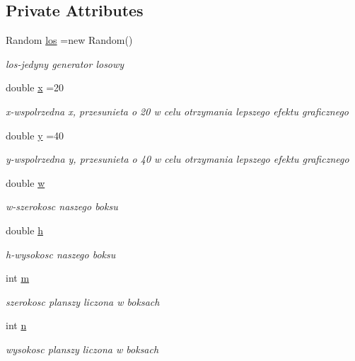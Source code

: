 \subsection*{Private Attributes}
\begin{DoxyCompactItemize}
\item 
Random \hyperlink{class_zadanie7_1_1_okno_wlasciwe_a9ae176d92e991a053b101aad6fdf7cdf}{los} =new Random()
\begin{DoxyCompactList}\small\item\em los-\/jedyny generator losowy \end{DoxyCompactList}\item 
double \hyperlink{class_zadanie7_1_1_okno_wlasciwe_afc22e58c9c97b94e580568fb79a36bef}{x} =20
\begin{DoxyCompactList}\small\item\em x-\/wspolrzedna x, przesunieta o 20 w celu otrzymania lepszego efektu graficznego \end{DoxyCompactList}\item 
double \hyperlink{class_zadanie7_1_1_okno_wlasciwe_a59d4e6fb76e7711fb07bfcb0df74d9e6}{y} =40
\begin{DoxyCompactList}\small\item\em y-\/wspolrzedna y, przesunieta o 40 w celu otrzymania lepszego efektu graficznego \end{DoxyCompactList}\item 
double \hyperlink{class_zadanie7_1_1_okno_wlasciwe_a160d088398a77a3897d8bac099c56577}{w}
\begin{DoxyCompactList}\small\item\em w-\/szerokosc naszego boksu \end{DoxyCompactList}\item 
double \hyperlink{class_zadanie7_1_1_okno_wlasciwe_ac8bed36b0724579fa1bab6098bbd4204}{h}
\begin{DoxyCompactList}\small\item\em h-\/wysokosc naszego boksu \end{DoxyCompactList}\item 
int \hyperlink{class_zadanie7_1_1_okno_wlasciwe_a2ac6a5aa6284f4835a12a68754ae80b8}{m}
\begin{DoxyCompactList}\small\item\em szerokosc planszy liczona w boksach \end{DoxyCompactList}\item 
int \hyperlink{class_zadanie7_1_1_okno_wlasciwe_a9def326ff03537e3e304e17fc99ab674}{n}
\begin{DoxyCompactList}\small\item\em wysokosc planszy liczona w boksach \end{DoxyCompactList}\item 

\end{DoxyCompactItemize}
